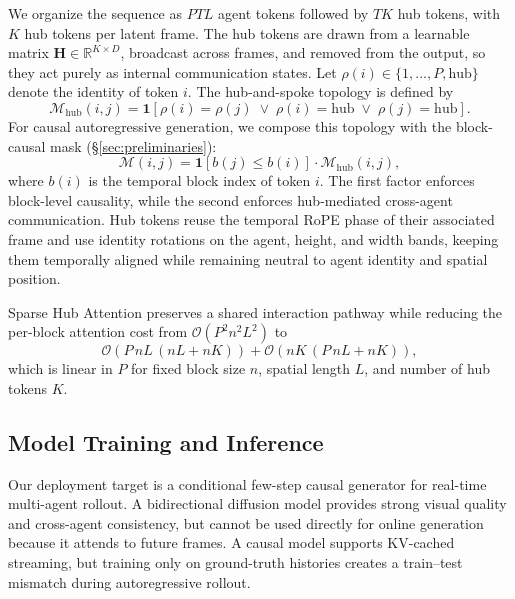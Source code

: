 \documentclass{llmxive}
\begin{document}
We organize the sequence as $PTL$ agent tokens followed by $TK$ hub tokens, with $K$ hub tokens per latent frame.
The hub tokens are drawn from a learnable matrix $\mathbf{H}\in\mathbb{R}^{K\times D}$, broadcast across frames, and removed from the output, so they act purely as internal communication states.
Let $\rho(i)\in\{1,\ldots,P,\mathrm{hub}\}$ denote the identity of token $i$.
The hub-and-spoke topology is defined by
\begin{equation}
\mathcal{M}_{\mathrm{hub}}(i,j)
=
\mathbf{1}\!\left[
\rho(i)=\rho(j)
\;\vee\;
\rho(i)=\mathrm{hub}
\;\vee\;
\rho(j)=\mathrm{hub}
\right].
\end{equation}
For causal autoregressive generation, we compose this topology with the block-causal mask (\S\ref{sec:preliminaries}):
\begin{equation}
\mathcal{M}(i,j)
=
\mathbf{1}\!\left[b(j)\leq b(i)\right]
\cdot
\mathcal{M}_{\mathrm{hub}}(i,j),
\end{equation}
where $b(i)$ is the temporal block index of token $i$.
The first factor enforces block-level causality, while the second enforces hub-mediated cross-agent communication.
Hub tokens reuse the temporal RoPE phase of their associated frame and use identity rotations on the agent, height, and width bands, keeping them temporally aligned while remaining neutral to agent identity and spatial position.

Sparse Hub Attention preserves a shared interaction pathway while reducing the per-block attention cost from $\mathcal{O}(P^2 n^2 L^2)$ to
\begin{equation}
\mathcal{O}\!\left(P\,nL\,(nL+nK)\right)
+
\mathcal{O}\!\left(nK\,(P\,nL+nK)\right),
\end{equation}
which is linear in $P$ for fixed block size $n$, spatial length $L$, and number of hub tokens $K$.


\subsection{Model Training and Inference}
\label{sec:causal-distillation}
Our deployment target is a conditional few-step causal generator for real-time multi-agent rollout.
A bidirectional diffusion model provides strong visual quality and cross-agent consistency, but cannot be used directly for online generation because it attends to future frames.
A causal model supports KV-cached streaming, but training only on ground-truth histories creates a train--test mismatch during autoregressive rollout.
\end{document}

